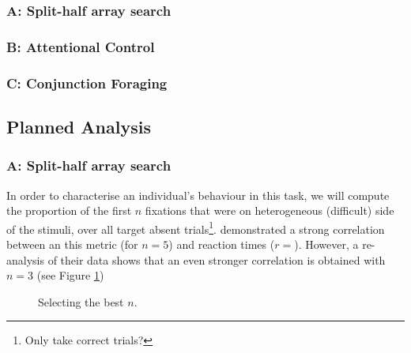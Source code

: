 \documentclass[a4paper, oneside, 11pt, onecolumn]{article}
\begin{document}
\subsubsection{A: Split-half array search}

\subsubsection{B: Attentional Control}

\subsubsection{C: Conjunction Foraging}

\subsection{Planned Analysis}

\subsubsection{A: Split-half array search}

In order to characterise an individual's behaviour in this task, we will compute the proportion of the first $n$ fixations that were on heterogeneous (difficult) side of the stimuli, over all target absent trials\footnote{Only take correct trials?}. \cite{nowakowsak2017} demonstrated a strong correlation between an this metric (for $n=5$) and reaction times ($r=$). However, a re-analysis of their data shows that an even stronger correlation is obtained with $n=3$ (see Figure \ref{fig:nowakowskaBestN})

\begin{figure}
\centering
{}
\caption{Selecting the best $n$.}
\label{fig:nowakowskaBestN}
\end{figure}
\end{document}
